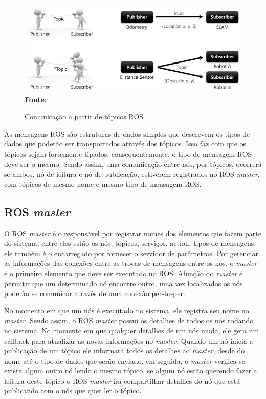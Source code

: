 \begin{figure}[ht]
	\caption{Comunicação a partir de tópicos ROS}
	\begin{center}
		\includegraphics[scale=0.51]{imagens/rostopic.png}\\
		{\small \textbf{Fonte:} }
    \end{center}\label{fig:rostopic}
\end{figure}

As mensagens ROS são estruturas de dados simples que descrevem os tipos de dados que poderão ser transportados através dos tópicos. Isso faz com que os tópicos sejam fortemente tipados, consequentemente, o tipo de mensagem ROS deve ser o mesmo. Sendo assim, uma comunicação entre nós, por tópicos, ocorrerá se ambos, nó de leitura e nó de publicação, estiverem registrados no ROS \textit{master}, com tópicos de mesmo nome e mesmo tipo de mensagem ROS\@.


\subsection{ROS \textit{master}}

O ROS \textit{master} é o responsável por registrar nomes dos elementos que fazem parte do sistema, entre eles estão os nós, tópicos, serviços, action, tipos de mensagens, ele também é o encarregado por fornecer o servidor de parâmetros. Por gerenciar as informações das conexões entre as trocas de mensagens entre os nós, o \textit{master} é o primeiro elemento que deve ser executado no ROS. Afunção do \textit{master} é permitir que um determinado nó encontre outro, uma vez localizados os nós poderão se comunicar através de uma conexão per-to-per.

No momento em que um nós é executado no sistema, ele registra seu nome no \textit{master}. Sendo assim, o ROS \textit{master} possui os detalhes de todos os nós rodando no sistema. No momento em que qualquer detalhes de um nós muda, ele gera um callback para atualizar as novas informações no \textit{master}. Quando um nó inicia a publicação de um tópico ele informará todos os detalhes ao \textit{master}, desde do nome até o tipo de dados que serão enviado, em seguida, o \textit{master} verifica se existe algum outro nó lendo o mesmo tópico, se algum nó estão querendo fazer a leitura deste tópico o ROS \textit{master} irá compartilhar detalhes do nó que está publicando com o nós que quer ler o tópico.

